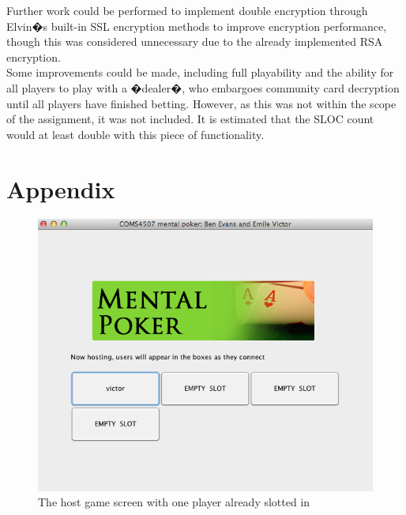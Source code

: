 \documentclass[11pt, oneside]{article}   	%
\begin{document}
Further work could be performed to implement double encryption through Elvin�s built-in SSL encryption methods to improve encryption performance, though this was considered unnecessary due to the already implemented RSA encryption.\\

Some improvements could be made, including full playability and the ability for all players to play with a �dealer�, who embargoes community card decryption until all players have finished betting. However, as this was not within the scope of the assignment, it was not included. It is estimated that the SLOC count would at least double with this piece of functionality.\\



\section{Appendix}

\begin{figure}[h!]

\caption{The host game screen with one player already slotted in}
	\label{hostGame}
\centering
\includegraphics[bb=0 0 671 541,scale=0.55]{images/hostgame.png}
\end{figure}
\end{document}
